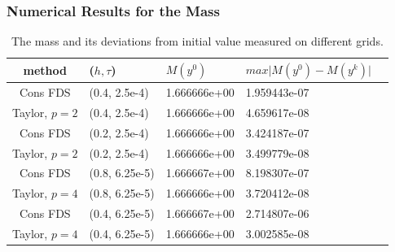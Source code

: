 \documentclass{beamer}
\begin{document}
\begin{frame}
\frametitle{Numerical Results for the Mass}
\begin{table}[ht]
\centering
\small
		\begin{tabular}{||c|l|l|l|l||}
			\hline
method        & ($h,\tau$)& $M(y^0)$ &   $max \vert M(y^0) - M(y^k) \vert$   \\
   			\hline 
Cons FDS            &  (0.4, 2.5e-4) & 1.666666e+00 &  1.959443e-07                \\
Taylor, $p=2$     &  (0.4, 2.5e-4) & 1.666666e+00 &  4.659617e-08                 \\
Cons FDS            &  (0.2, 2.5e-4) & 1.666666e+00 & 3.424187e-07               \\
Taylor, $p=2$     &  (0.2, 2.5e-4) & 1.666666e+00 & 3.499779e-08                \\
	   		\hline
			\hline
Cons FDS           &  (0.8, 6.25e-5) & 1.666667e+00 & 8.198307e-07                    \\
Taylor, $p=4$     &  (0.8, 6.25e-5) & 1.666666e+00 &  3.720412e-08                      \\
Cons FDS           &  (0.4, 6.25e-5) & 1.666667e+00 &  2.714807e-06                     \\
Taylor, $p=4$    &  (0.4, 6.25e-5) & 1.666666e+00 &  3.002585e-08                      \\
			\hline 
			\hline
		\end{tabular}
		\caption{ The mass and its deviations from initial value measured on different grids. }
\label{tableMass}
\end{table}
\end{frame}

\end{document}
